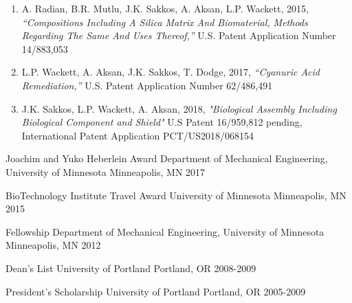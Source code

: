 \documentclass[11pt, letterpaper]{awesome-cv} %
\begin{document}
\begin{sloppypar}
%
\begin{cvparagraph}
	\begin{enumerate}
		\item {A. Radian, B.R. Mutlu, J.K. Sakkos, A. Aksan, L.P. Wackett, 2015, \textit{“Compositions Including A Silica Matrix And Biomaterial, Methods Regarding The Same And Uses Thereof,”} U.S. Patent Application Number 14/883,053}
		\item {L.P. Wackett, A. Aksan, J.K. Sakkos, T. Dodge, 2017, \textit{“Cyanuric Acid Remediation,”} U.S. Patent Application Number 62/486,491}
		\item {J.K. Sakkos, L.P. Wackett, A. Aksan, 2018, \textit{"Biological Assembly Including Biological Component and Shield"} U.S Patent 16/959,812 pending, International Patent Application PCT/US2018/068154}		
		
	\end{enumerate}
\end{cvparagraph}
%

\begin{cvhonors}
	
	\cvhonor
	{Joachim and Yuko Heberlein Award} %
	{Department of Mechanical Engineering, University of Minnesota} %
	{Minneapolis, MN} %
	{2017} %

	\cvhonor
	{BioTechnology Institute Travel Award} %
	{University of Minnesota} %
	{Minneapolis, MN} %
	{2015} %
	
	\cvhonor
	{Fellowship} %
	{Department of Mechanical Engineering, University of Minnesota} %
	{Minneapolis, MN} %
	{2012} %

	\cvhonor
	{Dean’s List} %
	{University of Portland} %
	{Portland, OR} %
	{2008-2009} %
	
	\cvhonor
	{President’s Scholarship} %
	{University of Portland} %
	{Portland, OR} %
	{2005-2009} %

\end{cvhonors}




\end{sloppypar}
\end{document}
